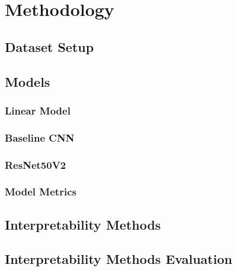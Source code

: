 \documentclass[biblatexBackend=bibtex]{tumthesis}
\begin{document}
\chapter{Methodology}
\label{ch:methodology}


\section{Dataset Setup}
\label{sec:methodology:tfds}

\section{Models}
\label{sec:methodology:models}

\subsection{Linear Model}
\label{sec:methodology:lm}

\subsection{Baseline CNN}
\label{sec:methodology:BL_CNN}

\subsection{ResNet50V2}
\label{sec:methodology:RN50V2}

\subsection{Model Metrics}
\label{sec:methodology:metrics}

\section{Interpretability Methods}
\label{sec:methodology:interpretability_methods}


%

\section{Interpretability Methods Evaluation}
\label{sec:methodology:vgig_eval}
\end{document}
